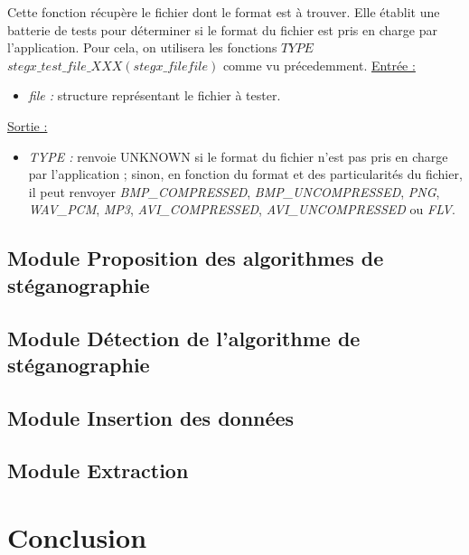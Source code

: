\documentclass[11pt]{article}
\begin{document}
Cette fonction récupère le fichier dont le format est à trouver. Elle établit une 
batterie de tests pour déterminer si le format du fichier est pris en charge 
par l'application. 
Pour cela, on utilisera les fonctions 
$TYPE$ $stegx\_test\_file\_XXX (stegx\_file file)$ comme vu précedemment. 
\newline
\underline{Entrée :} 
\begin{itemize}
\item \textit{file :} structure représentant le fichier à tester. 
\end{itemize}
\underline{Sortie :} 
\begin{itemize}
\item \textit{TYPE :} renvoie UNKNOWN si le format du fichier n'est pas pris en 
charge par l'application ; sinon, en fonction du format et des particularités 
du fichier, il peut renvoyer \textit{BMP\_COMPRESSED}, \textit{BMP\_UNCOMPRESSED}, 
\textit{PNG}, \textit{WAV\_PCM}, \textit{MP3}, \textit{AVI\_COMPRESSED}, 
\textit{AVI\_UNCOMPRESSED} ou \textit{FLV}. 
\newline 
\end{itemize}



\subsection{Module Proposition des algorithmes 
de stéganographie}
\subsection{Module Détection de l'algorithme de
stéganographie}
\subsection{Module Insertion des données}
\subsection{Module Extraction}

\section{Conclusion}
\end{document}
